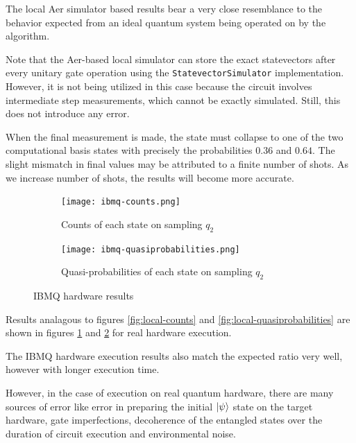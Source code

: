 \documentclass[11pt,a4paper]{article}
\begin{document}
The local Aer simulator based results bear a very close resemblance to the behavior expected from an ideal quantum system being operated on by the algorithm.

Note that the Aer-based local simulator can store the exact statevectors after every unitary gate operation using the \texttt{StatevectorSimulator} implementation. However, it is not being utilized in this case because the circuit involves intermediate step measurements, which cannot be exactly simulated. Still, this does not introduce any error.

When the final measurement is made, the state must collapse to one of the two computational basis states with precisely the probabilities $0.36$ and $0.64$. The slight mismatch in final values may be attributed to a finite number of shots. As we increase number of shots, the results will become more accurate.

\begin{figure}[H]
    \centering
    \begin{subfigure}[t]{0.45\textwidth}
        \centering
        \texttt{[image: ibmq-counts.png]} %
        \caption{Counts of each state on sampling $q_2$}
        \label{fig:ibmq-counts}
    \end{subfigure}
    \hfill
    \begin{subfigure}[t]{0.45\textwidth}
        \centering
        \texttt{[image: ibmq-quasiprobabilities.png]} %
        \caption{Quasi-probabilities of each state on sampling $q_2$}
        \label{fig:ibmq-quasiprobabilities}
    \end{subfigure}
    \caption{IBMQ hardware results}
    \label{fig:ibmq}
\end{figure}

Results analagous to figures \ref{fig:local-counts} and \ref{fig:local-quasiprobabilities} are shown in figures \ref{fig:ibmq-counts} and \ref{fig:ibmq-quasiprobabilities} for real hardware execution.

The IBMQ hardware execution results also match the expected ratio very well, however with longer execution time.

However, in the case of execution on real quantum hardware, there are many sources of error like error in preparing the initial $\ket{\psi}$ state on the target hardware, gate imperfections, decoherence of the entangled states over the duration of circuit execution and environmental noise.
\end{document}
